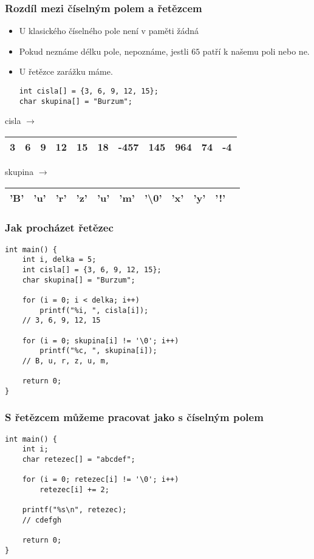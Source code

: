 \documentclass{beamer}
\newenvironment{itemizex}%
  {\large \begin{itemize}%
    \setlength{\itemsep}{8pt}%
    \setlength{\parskip}{8pt}}%
  {\end{itemize}}
\begin{document}
\begin{frame}[t,fragile]\frametitle{Rozdíl mezi číselným polem a řetězcem} 
\begin{itemizex}
    \item U klasického číselného pole není v paměti žádná 
    \item Pokud neznáme délku pole, nepoznáme, jestli $65$ patří k našemu poli nebo ne.
    \item U řetězce zarážku máme.
    \begin{verbatim} 
int cisla[] = {3, 6, 9, 12, 15};
char skupina[] = "Burzum";
    \end{verbatim}
\end{itemizex}
\begin{center}
cisla $\longrightarrow\,$\begin{tabular}{|c|c|c|c|c|c|c|c|c|c|c|}
\hline 3& 6& 9& 12& 15 &18&-457&145&964&74&-4 \\\hline
\end{tabular}
\vskip 5mm
skupina $\longrightarrow\,$\begin{tabular}{|c|c|c|c|c|c|c|c|c|c|c|}
\hline 'B'&'u'&'r'&'z'&'u'&'m'&'\textbackslash0'&'x'&'y'&'!' \\\hline
\end{tabular}
\end{center}
\end{frame}



\begin{frame}[t,fragile]\frametitle{Jak procházet řetězec} 
\begin{verbatim} 
int main() {
    int i, delka = 5;
    int cisla[] = {3, 6, 9, 12, 15};
    char skupina[] = "Burzum";

    for (i = 0; i < delka; i++)
        printf("%i, ", cisla[i]);
    // 3, 6, 9, 12, 15

    for (i = 0; skupina[i] != '\0'; i++) 
        printf("%c, ", skupina[i]);
    // B, u, r, z, u, m, 

    return 0;     
}
\end{verbatim}
\end{frame}


\begin{frame}[t,fragile]\frametitle{S řetězcem můžeme pracovat jako s číselným polem} 
\begin{verbatim} 
int main() {
    int i;
    char retezec[] = "abcdef";

    for (i = 0; retezec[i] != '\0'; i++)
        retezec[i] += 2;

    printf("%s\n", retezec);
    // cdefgh

    return 0;     
}
\end{verbatim}
\end{frame}
\end{document}
